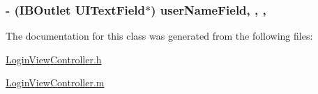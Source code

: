 \subsubsection[{user\+Name\+Field}]{\setlength{\rightskip}{0pt plus 5cm}-\/ (I\+B\+Outlet U\+I\+Text\+Field$\ast$) user\+Name\+Field\hspace{0.3cm}{\ttfamily [read]}, {\ttfamily [write]}, {\ttfamily [nonatomic]}, {\ttfamily [weak]}}\label{interface_login_view_controller_a7a4a67075fd3a3c5f862ab4e50ba5b82}


The documentation for this class was generated from the following files\+:\begin{DoxyCompactItemize}
\item 
\hyperlink{_login_view_controller_8h}{Login\+View\+Controller.\+h}\item 
\hyperlink{_login_view_controller_8m}{Login\+View\+Controller.\+m}\end{DoxyCompactItemize}
